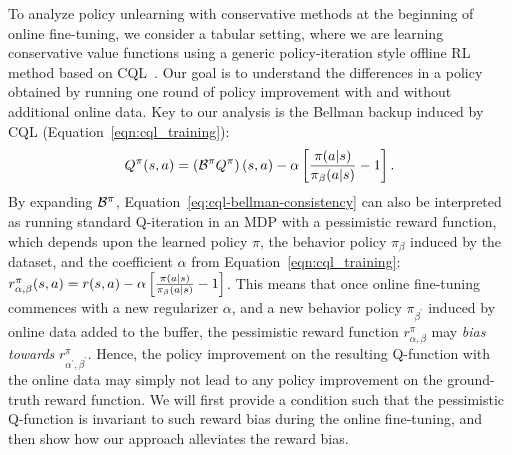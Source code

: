 To analyze policy unlearning with conservative methods at the beginning of online fine-tuning, we consider a tabular setting, where we are learning conservative value functions using a generic policy-iteration style offline RL method based on CQL~\citep{kumar2020conservative}. Our goal is to understand the differences in a policy obtained by running one round of policy improvement with and without additional online data. Key to our analysis is the Bellman backup induced by CQL (Equation~\ref{eqn:cql_training}):
\begin{align}
\label{eq:cql-bellman-consistency}
\footnotesize{
    Q^\pi(\bs, \ba) = \left(\mathcal{B}^\pi Q^\pi \right)(\bs, \ba) - \alpha \left[ \frac{\pi(\ba|\bs)}{\pi_\beta(\ba|\bs)} - 1 \right].}
\end{align}
By expanding $\mathcal B^\pi$, Equation~\ref{eq:cql-bellman-consistency} can also be interpreted as running standard Q-iteration in an MDP with a pessimistic reward function, which depends upon the learned policy $\pi$, the behavior policy $\pi_\beta$ induced by the dataset, and the coefficient $\alpha$ from Equation~\ref{eqn:cql_training}:
$r^\pi_{\alpha,\beta}(s,a) = r(s,a) - \alpha\left[  \frac{\pi(a|s)}{\pi_\beta(a|s)} - 1  \right]$. This means that once online fine-tuning commences with a new regularizer $\alpha$, and a new behavior policy $\pi_{\beta^\prime}$ induced by online data added to the buffer, the pessimistic reward function $r^\pi_{\alpha,\beta}$ may {\em bias towards} $r^\pi_{\alpha^\prime,\beta^\prime}$. Hence, the policy improvement on the resulting Q-function with the online data may simply not lead to any policy improvement on the ground-truth reward function. We will first provide a condition such that the pessimistic Q-function is invariant to such reward bias during the online fine-tuning, and then show how our approach alleviates the reward bias.


